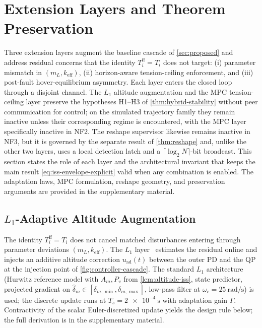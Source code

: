 \documentclass[lettersize,journal]{IEEEtran}
\begin{document}
\section{Extension Layers and Theorem Preservation}
\label{sec:Parameter_Adaptation_Tension_Constraints_and_Post-Fault_Formation_Reshape}
\label{sec:extensions}

Three extension layers augment the baseline cascade of \cref{sec:proposed} and address residual concerns that the identity $T_i^{\mathrm{ff}}=T_i$ does not target: (i) parameter mismatch in $(m_L, k_{\mathrm{eff}})$, (ii) horizon-aware tension-ceiling enforcement, and (iii) post-fault hover-equilibrium asymmetry. Each layer enters the closed loop through a disjoint channel. The $L_1$ altitude augmentation and the MPC tension-ceiling layer preserve the hypotheses H1--H3 of \cref{thm:hybrid-stability} without peer communication for control; on the simulated trajectory family they remain inactive unless their corresponding regime is encountered, with the MPC layer specifically inactive in NF2. The reshape supervisor likewise remains inactive in NF3, but it is governed by the separate result of \cref{thm:reshape} and, unlike the other two layers, uses a local detection latch and a $\lceil\log_2 N\rceil$-bit broadcast. This section states the role of each layer and the architectural invariant that keeps the main result \eqref{eq:iss-envelope-explicit} valid when any combination is enabled. The adaptation laws, MPC formulation, reshape geometry, and preservation arguments are provided in the supplementary material.

\subsection{$L_1$-Adaptive Altitude Augmentation}
\label{sec:l1-augmentation}

The identity $T_i^{\mathrm{ff}}=T_i$ does not cancel matched disturbances entering through parameter deviations $(m_L, k_{\mathrm{eff}})$. The $L_1$ layer~\cite{Hovakimyan2010book,CaoHovakimyan2008} estimates the residual online and injects an additive altitude correction $u_{\mathrm{ad}}(t)$ between the outer PD and the QP at the injection point of \cref{fig:controller-cascade}. The standard $L_1$ architecture (Hurwitz reference model with $A_m,P_v$ from \cref{lem:altitude-iss}, state predictor, projected gradient on $\hat\delta_m \in [\delta_{m,\min},\delta_{m,\max}]$, low-pass filter at $\omega_c=\SI{25}{\radian\per\second}$) is used; the discrete update runs at $T_s=\SI{2e-4}{\second}$ with adaptation gain $\Gamma$. Contractivity of the scalar Euler-discretized update yields the design rule below; the full derivation is in the supplementary material.
\end{document}
